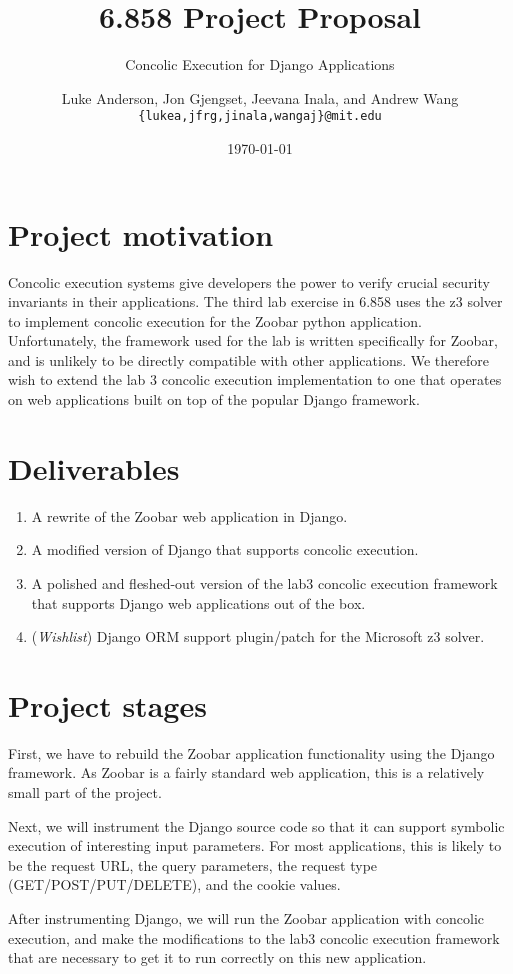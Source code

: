\documentclass[a4page]{scrartcl}
\author{Luke Anderson, Jon Gjengset, Jeevana Inala, and Andrew Wang \\
	\texttt{\{lukea,jfrg,jinala,wangaj\}@mit.edu}
}
\title{6.858 Project Proposal}
\subtitle{Concolic Execution for Django Applications}
\date{\today}
\begin{document}
\maketitle

\section{Project motivation}
Concolic execution systems give developers the power to verify crucial security
invariants in their applications. The third lab exercise in 6.858 uses the z3 solver to implement concolic
execution for the Zoobar python application. Unfortunately, the framework used
for the lab is written specifically for Zoobar, and is unlikely to be directly
compatible with other applications. We therefore wish to extend the lab
3 concolic execution implementation to one that operates on web applications
built on top of the popular Django framework.

\section{Deliverables}
\begin{enumerate}
	\item A rewrite of the Zoobar web application in Django.
	\item A modified version of Django that supports concolic execution.
	\item A polished and fleshed-out version of the lab3 concolic execution
		framework that supports Django web applications out of the box.
	\item (\textit{Wishlist}) Django ORM support plugin/patch for the
		Microsoft z3 solver.
\end{enumerate}

\section{Project stages}
First, we have to rebuild the Zoobar application functionality using the Django
framework. As Zoobar is a fairly standard web application, this is a relatively
small part of the project.

Next, we will instrument the Django source code so that it can support symbolic
execution of interesting input parameters. For most applications, this is
likely to be the request URL, the query parameters, the request type
(GET/POST/PUT/DELETE), and the cookie values.

After instrumenting Django, we will run the Zoobar application with concolic
execution, and make the modifications to the lab3 concolic execution framework
that are necessary to get it to run correctly on this new application.
\end{document}
